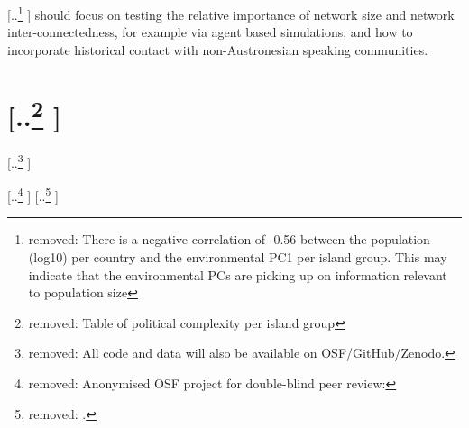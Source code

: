 \documentclass[unnumsec,webpdf,modern,medium]{oup-authoring-template}
\providecommand{\DIFaddtex}[1]{{\protect\color{blue} \sf #1}} %
\providecommand{\DIFdeltex}[1]{{\protect\color{red} [..\footnote{removed: #1} ]}} %
\providecommand{\DIFaddbegin}{} %
\providecommand{\DIFaddend}{} %
\providecommand{\DIFdelbegin}{} %
\providecommand{\DIFdelend}{} %
\providecommand{\DIFadd}[1]{\texorpdfstring{\DIFaddtex{#1}}{#1}} %
\providecommand{\DIFdel}[1]{\texorpdfstring{\DIFdeltex{#1}}{}} %
\newcommand{\DIFscaledelfig}{0.5}
\newlength{\DIFdelgraphicswidth} %
\newlength{\DIFdelgraphicsheight} %
\newcommand{\DIFaddincludegraphics}[2][]{{\color{blue}\fbox{\DIFOincludegraphics[#1]{#2}}}} %
\newcommand{\DIFdelincludegraphics}[2][]{%
\sbox{\DIFdelgraphicsbox}{\DIFOincludegraphics[#1]{#2}}%
\settoboxwidth{\DIFdelgraphicswidth}{\DIFdelgraphicsbox} %
\settoboxtotalheight{\DIFdelgraphicsheight}{\DIFdelgraphicsbox} %
\scalebox{\DIFscaledelfig}{%
\parbox[b]{\DIFdelgraphicswidth}{\usebox{\DIFdelgraphicsbox}\\[-\baselineskip] \rule{\DIFdelgraphicswidth}{0em}}\llap{\resizebox{\DIFdelgraphicswidth}{\DIFdelgraphicsheight}{%
\setlength{\unitlength}{\DIFdelgraphicswidth}%
\begin{picture}(1,1)%
\thicklines\linethickness{2pt} %
{\color[rgb]{1,0,0}\put(0,0){\framebox(1,1){}}}%
{\color[rgb]{1,0,0}\put(0,0){\line( 1,1){1}}}%
{\color[rgb]{1,0,0}\put(0,1){\line(1,-1){1}}}%
\end{picture}%
}\hspace*{3pt}}} %
} %
\DeclareRobustCommand{\DIFaddbegin}{\DIFOaddbegin \let\includegraphics\DIFaddincludegraphics} %
\DeclareRobustCommand{\DIFaddend}{\DIFOaddend \let\includegraphics\DIFOincludegraphics} %
\DeclareRobustCommand{\DIFdelbegin}{\DIFOdelbegin \let\includegraphics\DIFdelincludegraphics} %
\DeclareRobustCommand{\DIFdelend}{\DIFOaddend \let\includegraphics\DIFOincludegraphics} %
\begin{document}
\DIFdel{There is a negative correlation of -0.56 between the population (log10) per country and the environmental PC1 per island group. This may indicate that the environmental PCs are picking up on information relevant to population size}\DIFdelend \DIFaddbegin \DIFadd{should focus on testing the relative importance of network size and network inter-connectedness, for example via agent based simulations, and how to incorporate historical contact with non-Austronesian speaking communities}\DIFaddend .

\DIFdelbegin %
\DIFdelend %


\DIFdelbegin \section{\DIFdel{Table of political complexity per island group }}
\addtocounter{section}{-1}%
\DIFdel{All code and data will also be available on OSF/GitHub/Zenodo.
}\DIFdelend %

\DIFdelbegin \DIFdel{Anonymised OSF project for double-blind peer review: }%
\DIFdel{.
}\DIFdelend %


\DIFdelbegin %
\DIFdelend %
\end{document}
